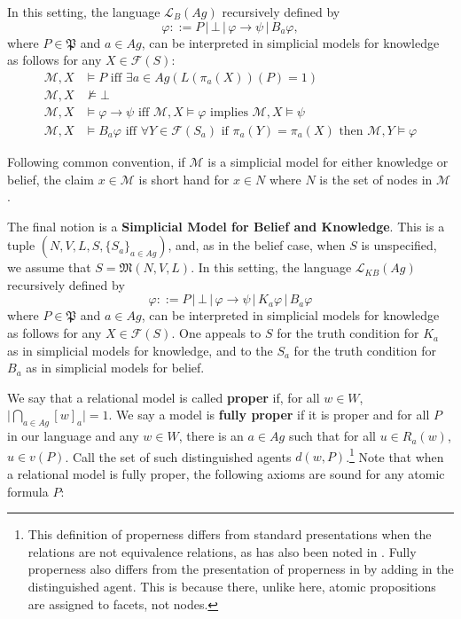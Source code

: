 \documentclass[11pt]{article}
\theoremstyle{definition}
\newcommand{\M}{\mathcal{M}}
\newcommand{\defin}[1]{\textbf{#1}}
\renewcommand{\phi}{\varphi}
\newcommand{\lthen}{\rightarrow}
\newcommand{\F}{\mathcal{F}}
\renewcommand{\M}{\mathcal{M}}
\renewcommand{\L}{\mathcal{L}}
\begin{document}
	In this setting, the language $\L_{B}(Ag)$ recursively defined by
	$$\varphi ::= P \, | \, \bot \, | \, \phi \lthen \psi \, | \, B_{a}\phi,$$
	where $P \in \mathfrak{P}$ and $a \in Ag$, can be interpreted in simplicial models for knowledge as follows for any $X\in\F(S)$:
	\begin{align*}
		\M,X & \models P \text{ iff } \exists a\in Ag(L(\pi_a(X))(P)=1)\\
		\M,X & \nvDash \bot\\
		\M,X & \models \phi \lthen \psi \text{ iff } \M,X \models \phi \text{ implies } \M,X \models \psi\\
		\M,X & \models B_a \phi \text{ iff } \forall Y \in \F(S_a) \text{ if } \pi_a(Y) = \pi_a(X) \text{ then } \M,Y \models \phi
	\end{align*}
	
	Following common convention, if $\M$ is a simplicial model for either knowledge or belief, the claim $x\in\M$ is short hand for $x\in N$ where $N$ is the set of nodes in $\M$.
	
	The final notion is a \defin{Simplicial Model for Belief and Knowledge}. This is a tuple $(N,V,L,S,\{S_a\}_{a\in Ag})$, and, as in the belief case, when $S$ is unspecified, we assume that $S=\mathfrak{M}(N,V,L)$. 	In this setting, the language $\L_{KB}(Ag)$ recursively defined by
	$$\varphi ::= P \, | \, \bot \, | \, \phi \lthen \psi \, | \, K_{a}\phi \, | \, B_{a}\phi$$
	where $P \in \mathfrak{P}$ and $a \in Ag$, can be interpreted in simplicial models for knowledge as follows for any $X\in\F(S)$. One appeals to $S$ for the truth condition for $K_a$ as in simplicial models for knowledge, and to the $S_a$ for the truth condition for $B_a$ as in simplicial models for belief.
	
	We say that a relational model is called \defin{proper} if, for all $w \in W$, $\big|\bigcap_{a \in Ag} [w]_{a} \big| = 1$. We say a model is \defin{fully proper} if it is proper and for all $P$ in our language and any $w\in W$, there is an $a\in Ag$ such that for all $u\in R_a(w)$, $u\in v(P)$. Call the set of such distinguished agents $d(w,P)$.\footnote{This definition of properness differs from standard presentations when the relations are not equivalence relations, as has also been noted in \cite{Lehnherr_2025}. Fully properness also differs from the presentation of properness in \cite{BelSimp} by adding in the distinguished agent. This is because there, unlike here, atomic propositions are assigned to facets, not nodes.} Note that when a relational model is fully proper, the following axioms are sound for any atomic formula $P$:
	
\end{document}
